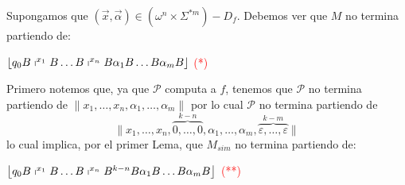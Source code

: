 \begin{frame}
  \begin{block}{}
    \PN Supongamos que $(\vec{x},\vec{\alpha}) \in (\omega^{n} \times \Sigma^{\ast m}) - D_{f}$. Debemos ver que $M$ no
    termina partiendo de:
    \begin{center}
      $\left\lfloor q_{0} B \shortmid^{x_{1}} B \dotsc B \shortmid^{x_{n}} B \alpha_{1} B \dotsc B \alpha_{m} B
      \right\rfloor$ \textcolor{red}{(*)}
    \end{center}

    \PN Primero notemos que, ya que $\mathcal{P}$ computa a $f$, tenemos que $\mathcal{P}$ no termina partiendo de
    $\lVert x_{1}, \dotsc, x_{n}, \alpha_{1}, \dotsc, \alpha_{m}\rVert$ por lo cual $\mathcal{P}$ no termina partiendo
    de
    \begin{equation*}
      \lVert x_{1}, \dotsc, x_{n}, \overset{k-n}{\overbrace{0,\dotsc,0}}, \alpha_{1}, \dotsc, \alpha_{m},
      \overset{k-m}{\overbrace{\varepsilon,\dotsc,\varepsilon}} \rVert
    \end{equation*}
    \PN lo cual implica, por el primer Lema, que $M_{sim}$ no termina partiendo de:
    \begin{center}
      $\left\lfloor q_{0} B \shortmid^{x_{1}} B \dotsc B \shortmid^{x_{n}} B^{k-n}B \alpha_{1} B \dotsc B \alpha_{m} B
      \right\rfloor$ \textcolor{red}{(**)}
    \end{center}
  \end{block}
\end{frame}
